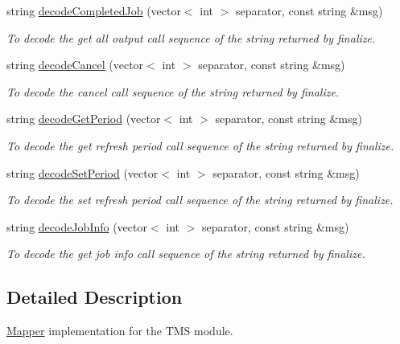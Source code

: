 \begin{DoxyCompactItemize}
string \hyperlink{classTMSMapper_a0592e967b8eb2ddeaadfc7fe92094345}{decodeCompletedJob} (vector$<$ int $>$ separator, const string \&msg)
\begin{DoxyCompactList}\small\item\em To decode the get all output call sequence of the string returned by finalize. \item\end{DoxyCompactList}\item 
string \hyperlink{classTMSMapper_a305e7e1543609faddfc92c85159c0df4}{decodeCancel} (vector$<$ int $>$ separator, const string \&msg)
\begin{DoxyCompactList}\small\item\em To decode the cancel call sequence of the string returned by finalize. \item\end{DoxyCompactList}\item 
string \hyperlink{classTMSMapper_ae0cf75031bc644de6269a468356bfd87}{decodeGetPeriod} (vector$<$ int $>$ separator, const string \&msg)
\begin{DoxyCompactList}\small\item\em To decode the get refresh period call sequence of the string returned by finalize. \item\end{DoxyCompactList}\item 
string \hyperlink{classTMSMapper_a46d9e9c019130eece031e627c0267f5d}{decodeSetPeriod} (vector$<$ int $>$ separator, const string \&msg)
\begin{DoxyCompactList}\small\item\em To decode the set refresh period call sequence of the string returned by finalize. \item\end{DoxyCompactList}\item 
string \hyperlink{classTMSMapper_a2082d6a55048ef9cf47fe6cfddb3e3f2}{decodeJobInfo} (vector$<$ int $>$ separator, const string \&msg)
\begin{DoxyCompactList}\small\item\em To decode the get job info call sequence of the string returned by finalize. \item\end{DoxyCompactList}\end{DoxyCompactItemize}


\subsection{Detailed Description}
\hyperlink{classMapper}{Mapper} implementation for the TMS module. 

